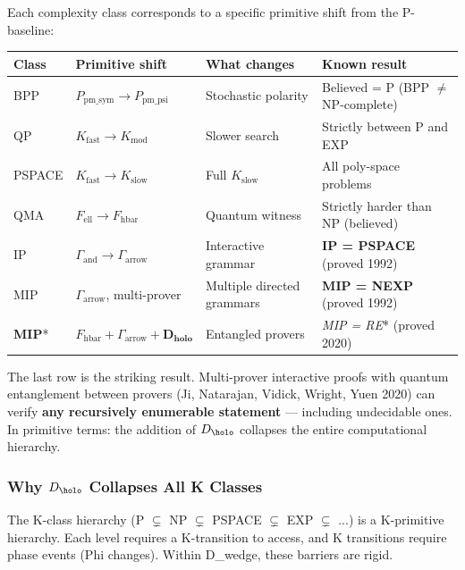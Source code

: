 \documentclass[12pt,a4paper]{article}
\begin{document}
Each complexity class corresponds to a specific primitive shift from the P-baseline:

\begin{table}[htbp]
\centering
\small
{}
\begin{tabularx}{\textwidth}{>{\centering\arraybackslash}X >{\centering\arraybackslash}X >{\centering\arraybackslash}X >{\centering\arraybackslash}X}
\toprule
\rowcolor{gray!25}\textbf{Class} & \textbf{Primitive shift} & \textbf{What changes} & \textbf{Known result} \\
\midrule
\rowcolors{1}{white}{gray!10}
BPP & $P_{\text{pm\_sym}} \to P_{\text{pm\_psi}}$ & Stochastic polarity & Believed = P (BPP $\neq$ NP-complete) \\
QP & $K_{\text{fast}} \to K_{\text{mod}}$ & Slower search & Strictly between P and EXP \\
PSPACE & $K_{\text{fast}} \to K_{\text{slow}}$ & Full $K_{\text{slow}}$ & All poly-space problems \\
QMA & $F_{\text{ell}} \to F_{\text{hbar}}$ & Quantum witness & Strictly harder than NP (believed) \\
IP & $\Gamma_{\text{and}} \to \Gamma_{\text{arrow}}$ & Interactive grammar & \textbf{IP = PSPACE} (proved 1992) \\
MIP & $\Gamma_{\text{arrow}}$, multi-prover & Multiple directed grammars & \textbf{MIP = NEXP} (proved 1992) \\
\textbf{MIP}* & $F_{\text{hbar}} + \Gamma_{\text{arrow}} + \mathbf{D_{\text{holo}}}$ & Entangled provers & \emph{\emph{MIP} = RE}* (proved 2020) \\
\bottomrule
\end{tabularx}
\end{table}

The last row is the striking result. Multi-prover interactive proofs with quantum entanglement between provers (Ji, Natarajan, Vidick, Wright, Yuen 2020) can verify \textbf{any recursively enumerable statement} --- including undecidable ones. In primitive terms: the addition of $D_{\holo}$ collapses the entire computational hierarchy.

\subsubsection{Why $D_{\holo}$ Collapses All K Classes}

The K-class hierarchy (P $\subsetneq$ NP $\subsetneq$ PSPACE $\subsetneq$ EXP $\subsetneq$ ...) is a K-primitive hierarchy. Each level requires a K-transition to access, and K transitions require phase events (Phi changes). Within D\_wedge, these barriers are rigid.
\end{document}
